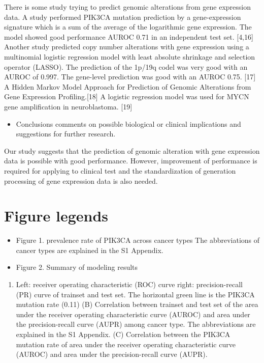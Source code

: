 \documentclass[10pt,letterpaper]{article}
\providecommand{\tightlist}{%
  \setlength{\itemsep}{0pt}\setlength{\parskip}{0pt}}
\begin{document}
There is some study trying to predict genomic alterations from gene
expression data. A study performed PIK3CA mutation prediction by a
gene-expression signature which is a sum of the average of the
logarithmic gene expression. The model showed good performance AUROC
0.71 in an independent test set. {[}4,16{]} Another study predicted copy
number alterations with gene expression using a multinomial logistic
regression model with least absolute shrinkage and selection operator
(LASSO). The prediction of the 1p/19q codel was very good with an AUROC
of 0.997. The gene-level prediction was good with an AUROC 0.75.
{[}17{]} A Hidden Markov Model Approach for Prediction of Genomic
Alterations from Gene Expression Profiling.{[}18{]} A logistic
regression model was used for MYCN gene amplification in neuroblastoma.
{[}19{]}

\begin{itemize}
\tightlist
\item
  Conclusions comments on possible biological or clinical implications
  and suggestions for further research.
\end{itemize}

Our study suggests that the prediction of genomic alteration with gene
expression data is possible with good performance. However, improvement
of performance is required for applying to clinical test and the
standardization of generation processing of gene expression data is also
needed.

\hypertarget{figure-legends}{%
\section{Figure legends}\label{figure-legends}}

\begin{itemize}
\item
  Figure 1. prevalence rate of PIK3CA across cancer types The
  abbreviations of cancer types are explained in the S1 Appendix.
\item
  Figure 2. Summary of modeling results
\end{itemize}

\begin{enumerate}
\def\labelenumi{(\Alph{enumi})}
\tightlist
\item
  Left: receiver operating characteristic (ROC) curve right:
  precision-recall (PR) curve of trainset and test set. The horizontal
  green line is the PIK3CA mutation rate (0.11) (B) Correlation between
  trainset and test set of the area under the receiver operating
  characteristic curve (AUROC) and area under the precision-recall curve
  (AUPR) among cancer type. The abbreviations are explained in the S1
  Appendix. (C) Correlation between the PIK3CA mutation rate of area
  under the receiver operating characteristic curve (AUROC) and area
  under the precision-recall curve (AUPR).
\end{enumerate}
\end{document}
